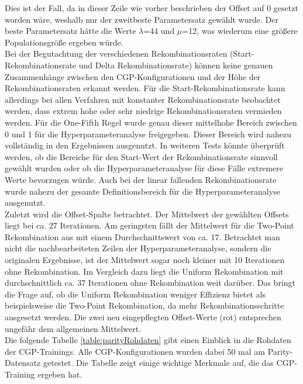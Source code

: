 Dies ist der Fall, da in dieser Zeile wie vorher beschrieben der Offset auf 0 gesetzt worden wäre, weshalb nur der zweitbeste Parametersatz gewählt wurde.
Der beste Parametersatz hätte die Werte $\lambda$=44 und $\mu$=12, was wiederum eine größere Populationsgröße ergeben würde.\\
Bei der Begutachtung der verschiedenen Rekombinationsraten (Start-Rekombinationsrate und Delta Rekombinationsrate) können keine genauen Zusammenhänge zwischen den CGP-Konfigurationen und der Höhe der Rekombinationsraten erkannt werden.
Für die Start-Rekombinationsrate kann allerdings bei allen Verfahren mit konstanter Rekombinationsrate beobachtet werden, dass extrem hohe oder sehr niedrige Rekombinationsraten vermieden werden.
Für die One-Fifth Regel wurde genau dieser mittelhohe Bereich zwischen 0 und 1 für die Hyperparameteranalyse freigegeben.
Dieser Bereich wird nahezu vollständig in den Ergebnissen ausgenutzt.
In weiteren Tests könnte überprüft werden, ob die Bereiche für den Start-Wert der Rekombinationsrate sinnvoll gewählt wurden oder ob die Hyperparameteranalyse für diese Fälle extremere Werte bevorzugen würde.
Auch bei der linear fallenden Rekombinationsrate wurde nahezu der gesamte Definitionsbereich für die Hyperparameteranalyse ausgenutzt.\\
Zuletzt wird die Offset-Spalte betrachtet.
Der Mittelwert der gewählten Offsets liegt bei ca. 27 Iterationen.
Am geringsten fällt der Mittelwert für die Two-Point Rekombination aus mit einem Durchschnittswert von ca. 17.
Betrachtet man nicht die nachbearbeiteten Zeilen der Hyperparameteranalyse, sondern die originalen Ergebnisse, ist der Mittelwert sogar noch kleiner mit 10 Iterationen ohne Rekombination.
Im Vergleich dazu liegt die Uniform Rekombination mit durchschnittlich ca. 37 Iterationen ohne Rekombination weit darüber.
Das bringt die Frage auf, ob die Uniform Rekombination weniger Effizienz bietet als beispielsweise die Two-Point Rekombination, da mehr Rekombinationsschritte ausgesetzt werden.
Die zwei neu eingepflegten Offset-Werte (rot) entsprechen ungefähr dem allgemeinen Mittelwert.\\


Die folgende Tabelle \ref{table:parityRohdaten} gibt einen Einblick in die Rohdaten der CGP-Trainings.
Alle CGP-Konfigurationen wurden dabei 50 mal am Parity-Datensatz getestet.
Die Tabelle zeigt einige wichtige Merkmale auf, die das CGP-Training ergeben hat.


